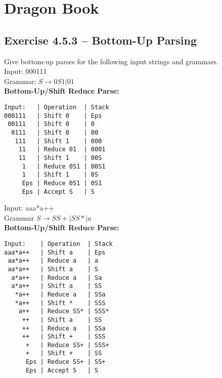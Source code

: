 \documentclass[letterpaper, 10pt]{article}
\begin{document}
\section{Dragon Book}
\subsection{Exercise 4.5.3 -- Bottom-Up Parsing}
Give bottom-up parses for the following input strings and grammars. \\

\noindent
Input: 000111 \\
Grammar: $S \rightarrow 0S1|01$\\

\noindent
\textbf{Bottom-Up/Shift Reduce Parse: }
\begin{verbatim}
Input:   | Operation  | Stack
000111   | Shift 0    | Eps
 00111   | Shift 0    | 0
  0111   | Shift 0    | 00
   111   | Shift 1    | 000
    11   | Reduce 01  | 0001
    11   | Shift 1    | 00S
     1   | Reduce 0S1 | 00S1
     1   | Shift 1    | 0S
     Eps | Reduce 0S1 | 0S1
     Eps | Accept S   | S
\end{verbatim}
\newpage
\noindent
Input: aaa*a++ \\
Grammar $S \rightarrow SS+|SS*|a$\\

\noindent
\textbf{Bottom-Up/Shift Reduce Parse: }
\begin{verbatim}
Input:    | Operation  | Stack
aaa*a++   | Shift a    | Eps
 aa*a++   | Reduce a   | a
 aa*a++   | Shift a    | S
  a*a++   | Reduce a   | Sa
  a*a++   | Shift a    | SS
   *a++   | Reduce a   | SSa
   *a++   | Shift *    | SSS
    a++   | Reduce SS* | SSS*
     ++   | Shift a    | SS
     ++   | Reduce a   | SSa
     ++   | Shift +    | SSS
      +   | Reduce SS+ | SSS+
      +   | Shift +    | SS
      Eps | Reduce SS+ | SS+
      Eps | Accept S   | S
\end{verbatim}
\end{document}
